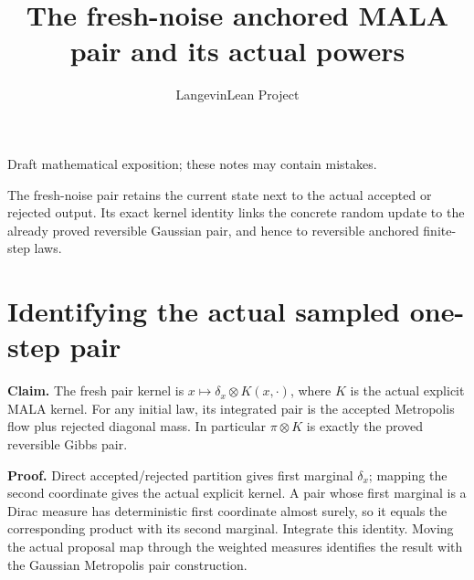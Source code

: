 \documentclass[11pt,a4paper]{article}
\title{\texorpdfstring{The fresh-noise anchored MALA pair and its actual powers}{The fresh-noise anchored MALA pair and its actual powers}}
\author{LangevinLean Project}
\date{}
\begin{document}
\maketitle
Draft mathematical exposition; these notes may contain mistakes.


The fresh-noise pair retains the current state next to the actual accepted or rejected output. Its exact kernel identity links the concrete random update to the already proved reversible Gaussian pair, and hence to reversible anchored finite-step laws.


\section{\texorpdfstring{Identifying the actual sampled one-step pair}{Identifying the actual sampled one-step pair}}


\textbf{Claim.} The fresh pair kernel is \(x\mapsto\delta_x\otimes K(x,\cdot)\), where \(K\) is the actual explicit MALA kernel. For any initial law, its integrated pair is the accepted Metropolis flow plus rejected diagonal mass. In particular \(\pi\otimes K\) is exactly the proved reversible Gibbs pair.



\textbf{Proof.} Direct accepted/\allowbreak{}rejected partition gives first marginal \(\delta_x\); mapping the second coordinate gives the actual explicit kernel. A pair whose first marginal is a Dirac measure has deterministic first coordinate almost surely, so it equals the corresponding product with its second marginal. Integrate this identity. Moving the actual proposal map through the weighted measures identifies the result with the Gaussian Metropolis pair construction.
\end{document}
